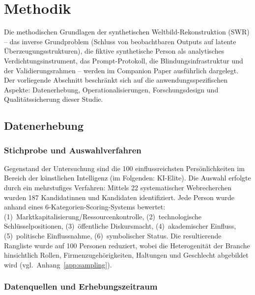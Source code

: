\documentclass[12pt,a4paper]{article}
\begin{document}
\section{Methodik}
\label{sec:methodik}

Die methodischen Grundlagen der synthetischen Weltbild-Rekonstruktion (SWR) -- das inverse Grundproblem (Schluss von beobachtbaren Outputs auf latente Überzeugungsstrukturen), die fiktive synthetische Person als analytisches Verdichtungsinstrument, das Prompt-Protokoll, die Blindungsinfrastruktur und der Validierungsrahmen -- werden im Companion Paper \citep{Geiger2026SWR} ausf\"uhrlich dargelegt. Der vorliegende Abschnitt beschr\"ankt sich auf die anwendungsspezifischen Aspekte: Datenerhebung, Operationalisierungen, Forschungsdesign und Qualit\"atssicherung dieser Studie.


\subsection{Datenerhebung}
\label{sec:methodik:daten}

\subsubsection{Stichprobe und Auswahlverfahren}

Gegenstand der Untersuchung sind die 100 einflussreichsten Pers\"onlichkeiten im Bereich der k\"unstlichen Intelligenz (im Folgenden: KI-Elite). Die Auswahl erfolgte durch ein mehrstufiges Verfahren: Mittels 22 systematischer Webrecherchen wurden 187 Kandidatinnen und Kandidaten identifiziert. Jede Person wurde anhand eines 6-Kategorien-Scoring-Systems bewertet: (1)~Marktkapitalisierung/Ressourcenkontrolle, (2)~technologische Schl\"usselpositionen, (3)~\"offentliche Diskursmacht, (4)~akademischer Einfluss, (5)~politische Einflussnahme, (6)~symbolischer Status. Die resultierende Rangliste wurde auf 100 Personen reduziert, wobei die Heterogenit\"at der Branche hinsichtlich Rollen, Firmenzugeh\"origkeiten, Haltungen und Geschlecht abgebildet wird (vgl.\ Anhang~\ref{app:sampling}).

\subsubsection{Datenquellen und Erhebungszeitraum}
\end{document}
